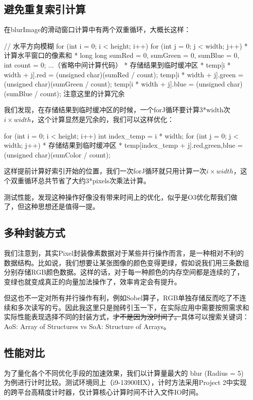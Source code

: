 \documentclass[11pt]{article}
\begin{document}
\subsection{避免重复索引计算}
在blurImage的滑动窗口计算中有两个双重循环，大概长这样：
\begin{codeline}
    // 水平方向模糊 
     for (int i = 0; i < height; i++) {
        for (int j = 0; j < width; j++) {
            * 计算水平窗口的像素和 *
            long long sumRed = 0, sumGreen = 0, sumBlue = 0, int count = 0; ...（省略中间计算代码）
            * 存储结果到临时缓冲区 *
            temp[i * width + j].red = (unsigned char)(sumRed / count);
            temp[i * width + j].green = (unsigned char)(sumGreen / count);
            temp[i * width + j].blue = (unsigned char)(sumBlue / count);
                 注意这里的计算冗余
        }
    }
\end{codeline}
我们发现，在存储结果到临时缓冲区的时候，一个forJ循环要计算3*width次$i\times width$，这个计算显然是冗余的，我们可以这样优化：
\begin{codeline}
     for (int i = 0; i < height; i++) {
        int index_temp = i * width;
        for (int j = 0; j < width; j++) {
            * 存储结果到临时缓冲区 *
            temp[index_temp + j].{red,green,blue} = (unsigned char)(sum{Color} / count);
        }
    }
\end{codeline}
这样提前计算好索引开始的位置，我们一次forJ循环就只用计算一次$i\times width$，这个双重循环总共节省了大约3*pixels次乘法计算。


测试性能，发现这种操作好像没有带来时间上的优化，似乎是O3优化帮我们做了，但这种思想还是值得一提。
\subsection{多种封装方式}
我们注意到，其实Pixel封装像素数据对于某些并行操作而言，是一种相对不利的数据结构。比如说，我们想要让某张图像的颜色变得更绿，假如说我们用三条数组分别存储RGB颜色数据。这样的话，对于每一种颜色的内存空间都是连续的了，变绿也就变成真正的向量加法操作了，效率肯定会有提升。


但这也不一定对所有并行操作有利，例如Sobel算子，RGB单独存储反而吃了不连续和多次读写的亏。因此我这里只是抛砖引玉一下，在实际应用中需要按照需求和实际性能表现选择不同的封装方式，\sout{才不是因为没时间了。}具体可以搜索关键词：AoS: Array of Structures vs SoA: Structure of Arrays。


\subsection{性能对比}
为了量化各个不同优化手段的加速效果，我们以计算量最大的 blur (Radius = 5)为例进行计时比较。测试环境同上（i9-13900HX），计时方法采用Project 2中实现的跨平台高精度计时器，仅计算核心计算时间不计入文件IO时间。
\end{document}
